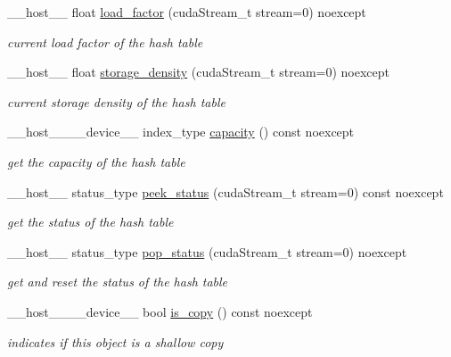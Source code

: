 \begin{DoxyCompactItemize}
\+\_\+\+\_\+host\+\_\+\+\_\+ float \hyperlink{classwarpcore_1_1CountingHashTable_aab45751b9ecffd2a8cd2b822cab26467}{load\+\_\+factor} (cuda\+Stream\+\_\+t stream=0) noexcept
\begin{DoxyCompactList}\small\item\em current load factor of the hash table \end{DoxyCompactList}\item 
\+\_\+\+\_\+host\+\_\+\+\_\+ float \hyperlink{classwarpcore_1_1CountingHashTable_a8ffc638d6747fdb66cfa9500e46f705c}{storage\+\_\+density} (cuda\+Stream\+\_\+t stream=0) noexcept
\begin{DoxyCompactList}\small\item\em current storage density of the hash table \end{DoxyCompactList}\item 
\+\_\+\+\_\+host\+\_\+\+\_\+\+\_\+\+\_\+device\+\_\+\+\_\+ index\+\_\+type \hyperlink{classwarpcore_1_1CountingHashTable_a05cdc2ffc3c11c2b10d90b3d8812e96d}{capacity} () const noexcept
\begin{DoxyCompactList}\small\item\em get the capacity of the hash table \end{DoxyCompactList}\item 
\+\_\+\+\_\+host\+\_\+\+\_\+ status\+\_\+type \hyperlink{classwarpcore_1_1CountingHashTable_ae9e388f29dae1952c2da7fed32415e35}{peek\+\_\+status} (cuda\+Stream\+\_\+t stream=0) const noexcept
\begin{DoxyCompactList}\small\item\em get the status of the hash table \end{DoxyCompactList}\item 
\+\_\+\+\_\+host\+\_\+\+\_\+ status\+\_\+type \hyperlink{classwarpcore_1_1CountingHashTable_a9313aefeadf39f1c0512f131859922ab}{pop\+\_\+status} (cuda\+Stream\+\_\+t stream=0) noexcept
\begin{DoxyCompactList}\small\item\em get and reset the status of the hash table \end{DoxyCompactList}\item 
\+\_\+\+\_\+host\+\_\+\+\_\+\+\_\+\+\_\+device\+\_\+\+\_\+ bool \hyperlink{classwarpcore_1_1CountingHashTable_abd203ab693aa931917013e11c23d444c}{is\+\_\+copy} () const noexcept
\begin{DoxyCompactList}\small\item\em indicates if this object is a shallow copy \end{DoxyCompactList}\end{DoxyCompactItemize}
